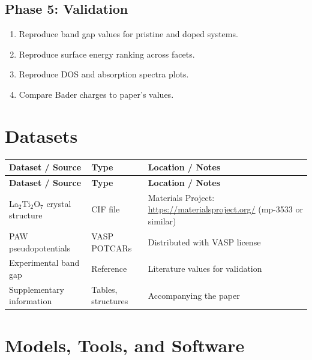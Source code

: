 \documentclass[11pt,a4paper]{article}
\begin{document}
\subsection{Phase 5: Validation}
\begin{enumerate}[label=\textbf{5.\arabic*}]
  \item Reproduce band gap values for pristine and doped systems.
  \item Reproduce surface energy ranking across facets.
  \item Reproduce DOS and absorption spectra plots.
  \item Compare Bader charges to paper's values.
\end{enumerate}

\section{Datasets}

\begin{longtable}{p{4.5cm} p{3.5cm} p{6cm}}
\toprule
\textbf{Dataset / Source} & \textbf{Type} & \textbf{Location / Notes} \\
\midrule
\endfirsthead
\toprule
\textbf{Dataset / Source} & \textbf{Type} & \textbf{Location / Notes} \\
\midrule
\endhead
La$_2$Ti$_2$O$_7$ crystal structure & CIF file & Materials Project: \url{https://materialsproject.org/} (mp-3533 or similar) \\
\midrule
PAW pseudopotentials & VASP POTCARs & Distributed with VASP license \\
\midrule
Experimental band gap & Reference & Literature values for validation \\
\midrule
Supplementary information & Tables, structures & Accompanying the paper \\
\bottomrule
\end{longtable}

\section{Models, Tools, and Software}
\end{document}
